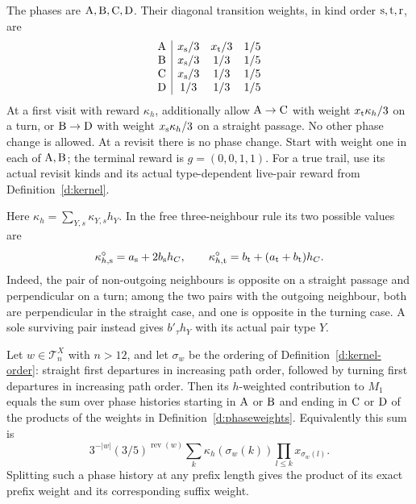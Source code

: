 \begin{definition}\label{d:phaseweights}
The phases are \({\rm A},{\rm B},{\rm C},{\rm D}\). Their
diagonal transition weights, in kind order \({\rm s},{\rm t},{\rm r}\), are
\[
 \begin{array}{c|ccc}
 {\rm A}&x_{\rm s}/3&x_{\rm t}/3&1/5\\
 {\rm B}&x_{\rm s}/3&1/3&1/5\\
 {\rm C}&x_{\rm s}/3&1/3&1/5\\
 {\rm D}&1/3&1/3&1/5
 \end{array}
\]
At a first visit with reward \(\kappa_h\), additionally allow
\({\rm A}\to{\rm C}\) with weight \(x_{\rm t}\kappa_h/3\) on a turn,
or \({\rm B}\to{\rm D}\) with weight \(x_{\rm s}\kappa_h/3\)
on a straight passage. No other phase change is allowed.
At a revisit there is no phase change.
Start with weight one in each of \({\rm A},{\rm B}\);
the terminal reward is \(g=(0,0,1,1)\).
For a true trail, use its actual revisit kinds and its actual
type-dependent live-pair reward from Definition~\ref{d:kernel}.
\end{definition}

Here \(\kappa_h=\sum_{Y,s}\kappa_{Y,s}h_Y\). In the free
three-neighbour rule its two possible values are
\[
 \kappa_{h,\rm s}^{\circ}=a_{\rm s}+2b_{\rm s}h_C,
 \qquad
 \kappa_{h,\rm t}^{\circ}=b_{\rm t}+(a_{\rm t}+b_{\rm t})h_C.
\]
Indeed, the pair of non-outgoing neighbours is opposite on a
straight passage and perpendicular on a turn; among the two pairs
with the outgoing neighbour, both are perpendicular in the straight
case, and one is opposite in the turning case. A sole surviving
pair instead gives \(b'_\tau h_Y\) with its actual pair type \(Y\).

\begin{lemma}\label{l:phase-expansion}
Let \(w\in\mathcal T_n^X\) with \(n>12\), and let \(\sigma_w\)
be the ordering of Definition~\ref{d:kernel-order}: straight first
departures in increasing path order, followed by turning first
departures in increasing path order. Then its \(h\)-weighted
contribution to \(M_1\) equals the sum over phase histories starting in
\({\rm A}\) or \({\rm B}\) and ending in \({\rm C}\) or \({\rm D}\)
of the products of the weights in Definition~\ref{d:phaseweights}.
Equivalently this sum is
\[
 3^{-|w|}(3/5)^{\operatorname{rev}(w)}
       \sum_k\kappa_h(\sigma_w(k))\prod_{l\le k}x_{\sigma_w(l)}.
\]
Splitting such a phase history at any prefix length gives the
product of its exact prefix weight and its corresponding suffix weight.
\end{lemma}

